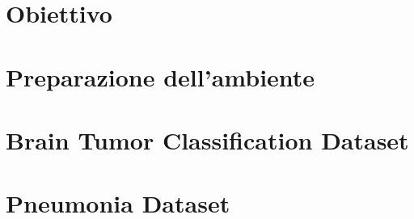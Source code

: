 \section{Obiettivo}
\section{Preparazione dell'ambiente}
\section{Brain Tumor Classification Dataset}
\section{Pneumonia Dataset}